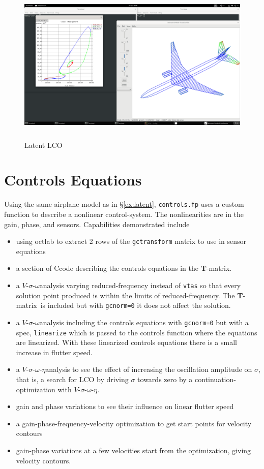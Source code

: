 \documentclass[11pt,openany,twoside]{book}
\numberwithin{equation}{section}		%
\def\Cpp{{C\nolinebreak[4]\hspace{-.05em}\raisebox{.4ex}{\tiny\bf ++}}\:}
\newcommand{\Cmd}[1]{{\sf #1}}
\newcommand{\Code}[1]{{\small\tt #1}}
\newcommand{\Tmatrix}{{\bf T}-matrix}
\newcommand{\VSO}{$V$-$\sigma$-$\omega$\:}
\newcommand{\VSOE}{$V$-$\sigma$-$\omega$-$\eta$\:}
\newcommand{\Sectref}[1]{\S\ref{#1}}
\begin{document}
\begin{figure}[ht]
		\includegraphics[height=3in,width=4.8in]{lco_screen.png}
	\centering
	\caption{Latent LCO}\label{fig:lco_screen}
\end{figure}

\newpage
\section{Controls Equations}\label{ex:controls}
Using the same airplane model as in \Sectref{ex:latent}, \Code{controls.fp} uses
a custom function to describe a nonlinear control-system.
The nonlinearities are in the gain, phase, and sensors.
Capabilities demonstrated include
\begin{itemize}
	\item using \Cmd{octlab} to extract 2 rows of the \Code{gctransform}
	    matrix to use in sensor equations
	\item a section of \Cpp code describing the controls equations in
	   the \Tmatrix.
	\item a \VSO analysis varying reduced-frequency instead of \Code{vtas}
	   so that every solution point produced is within the limits of
		reduced-frequency. The \Tmatrix\ is included but with \Code{gcnorm=0}
		it does not affect the solution.
	\item a \VSO analysis including the controls equations with \Code{gcnorm=0}
	   but with a spec, \Code{linearize} which is passed to the
		controls function where the equations are linearized. With these
		linearized controls equations there is a small increase in flutter speed.
	\item a \VSOE analysis to see the effect of increasing the oscillation
	   amplitude on $\sigma$, that is, a search for LCO by driving $\sigma$
		towards zero by a continuation-optimization 
		with \VSOE.
	\item gain and phase variations to see their influence on linear
	   flutter speed
	\item a gain-phase-frequency-velocity optimization to get start
	   points for velocity contours
	\item gain-phase variations at a few velocities start from the optimization,
	   giving velocity contours.
\end{itemize}
\end{document}
